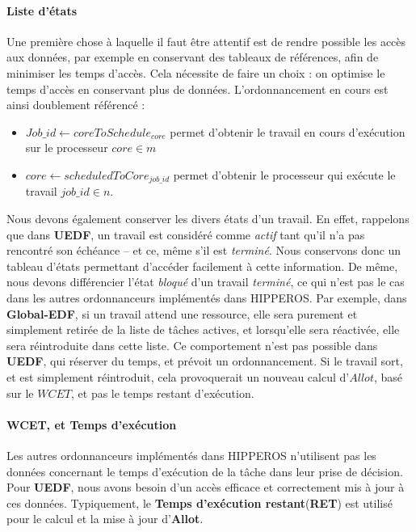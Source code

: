 		\paragraph{Liste d'états}
		Une première chose à laquelle il faut être attentif est de rendre possible les accès 
		aux données, par exemple en conservant des tableaux de références, afin de minimiser les temps 
		d'accès. Cela nécessite de faire un choix : on optimise le temps d'accès en conservant plus de données. 
		L'ordonnancement en cours est ainsi doublement référencé : 
		\begin{itemize}
			\setlength\itemsep{0.1em}
			\item $Job\_id \leftarrow coreToSchedule_{core}$ permet d'obtenir le travail en cours d'exécution sur le processeur $core \in m$
			\item $core \leftarrow scheduledToCore_{job\_id}$ permet d'obtenir le processeur qui exécute le travail $job\_id \in n$.
		\end{itemize}

		Nous devons également conserver les divers états d'un travail. En effet, rappelons que dans \textbf{UEDF}, 
		un travail est considéré comme \textit{actif} tant qu'il n'a pas rencontré son échéance -- et ce, 
		même s'il est \textit{terminé}. Nous conservons donc un tableau d'états permettant 
		d'accéder facilement à cette information.
		De même, nous devons différencier l'état \textit{bloqué} d'un travail \textit{terminé}, ce qui n'est pas le cas 
		dans les autres ordonnanceurs implémentés dans HIPPEROS. Par exemple, dans \textbf{Global-EDF}, si un travail 
		attend une ressource, elle sera purement et simplement retirée de la liste de tâches actives, et lorsqu'elle 
		sera réactivée, elle sera réintroduite dans cette liste. Ce comportement n'est pas possible dans \textbf{UEDF}, 
		qui \og{}réserver\fg{} du temps, et \og{}prévoit\fg{} un ordonnancement. Si le travail sort, et est simplement 
		réintroduit, cela provoquerait un nouveau calcul d'$Allot$, basé sur le $WCET$, et pas le temps restant d'exécution.
		
		\paragraph{WCET, et Temps d'exécution}
		
		Les autres ordonnanceurs implémentés dans HIPPEROS n'utilisent pas les données concernant le temps 
		d'exécution de la tâche dans leur prise de décision. 
		Pour \textbf{UEDF}, nous avons besoin d'un accès efficace et correctement mis à jour à ces données. 
		Typiquement, le \textbf{Temps d'exécution restant}(\textbf{RET}) est utilisé pour le calcul et la mise à jour 
		d'\textbf{Allot}.\newline
		
